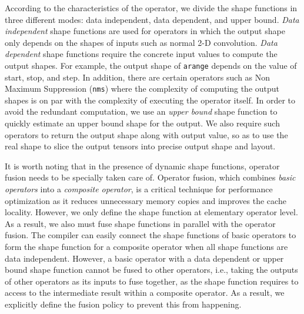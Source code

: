 According to the characteristics of the operator, we divide the shape functions in three
  different modes: data independent, data dependent, and upper bound.
{\em Data independent} shape functions are used for operators in which the output shape
  only depends on the shapes of inputs such as normal 2-D convolution.
{\em Data dependent} shape functions require the concrete input values to compute
  the output shapes. For example, the output shape of \texttt{arange} depends on the value of start, stop, and step.
In addition, there are certain operators such as Non Maximum Suppression (\texttt{nms})
  where the complexity of computing the output shapes is on par with the complexity of executing the operator itself.
In order to avoid the redundant computation, we use an {\em upper bound} shape function to
  quickly estimate an upper bound shape for the output.
We also require such operators to return the output shape along with output value,
  so as to use the real shape to slice the output tensors into precise output shape and layout.

It is worth noting that in the presence of dynamic shape functions, operator fusion
  needs to be specially taken care of.
Operator fusion, which combines {\em basic operators} into a {\em composite operator},
  is a critical technique for performance optimization as it reduces unnecessary memory copies
  and improves the cache locality.
However, we only define the shape function at elementary operator level.
As a result, we also must fuse shape functions in parallel with the operator fusion.
The compiler can easily connect the shape functions of basic operators to form the shape
  function for a composite operator when all shape functions are data independent.
However, a basic operator with a data dependent or upper bound shape function
  cannot be fused to other operators,
  i.e., taking the outputs of other operators as its inputs to fuse together,
  as the shape function requires to access to the intermediate result within a composite operator.
As a result, we explicitly define the fusion policy to prevent this from happening.

